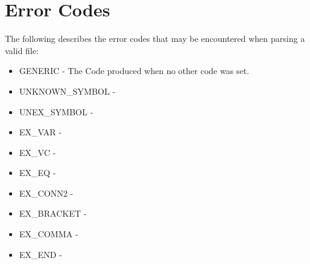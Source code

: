 \documentclass[11pt,a4paper]{article}
\begin{document}
\section{Error Codes}
The following describes the error codes that may be encountered when parsing a valid file:
\begin{itemize}
    \item GENERIC - The Code produced when no other code was set.
    \item UNKNOWN\_SYMBOL -
    \item UNEX\_SYMBOL -
    \item EX\_VAR - 
    \item EX\_VC -
    \item EX\_EQ -
    \item EX\_CONN2 -
    \item EX\_BRACKET -
    \item EX\_COMMA -
    \item EX\_END - 
\end{itemize}
\end{document}
